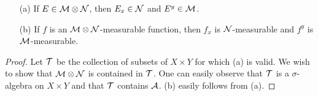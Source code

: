 \begin{prop}
    \begin{enumerate}
        \item[(a)]
        {
            If $E\in{\mathcal{M}}\otimes{\mathcal{N}}$, then $E_x\in{\mathcal{N}}$ and $E^y\in{\mathcal{M}}$.
        }
        \item[(b)]
        {
            If $f$ is an ${\mathcal{M}}\otimes{\mathcal{N}}$-measurable function, then $f_x$ is ${\mathcal{N}}$-measurable and $f^y$ is ${\mathcal{M}}$-measurable.
        }
    \end{enumerate}
\end{prop}
\begin{proof}
    Let ${\mathcal{T}}$ be the collection of subsets of $X\times Y$ for which (a) is valid.
    We wish to show that ${\mathcal{M}}\otimes{\mathcal{N}}$ is contained in ${\mathcal{T}}$.
    One can easily observe that ${\mathcal{T}}$ is a $\sigma$-algebra on $X\times Y$ and that ${\mathcal{T}}$ contains ${\mathcal{A}}$.
    (b) easily follows from (a).
\end{proof}

